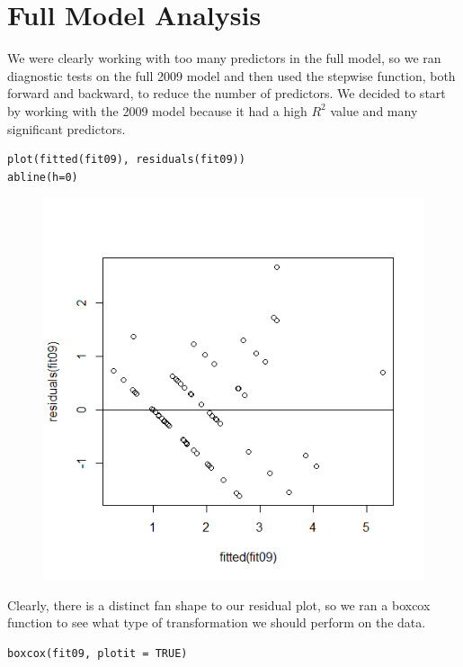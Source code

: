 \documentclass[]{scrartcl}
\begin{document}
\section*{Full Model Analysis}
We were clearly working with too many predictors in the full model, so we ran diagnostic tests on the full 2009 model and then used the stepwise function, both forward and backward, to reduce the number of predictors. We decided to start by working with the 2009 model because it had a high $R^{2}$ value and many significant predictors.
\footnotesize
\begin{verbatim}
plot(fitted(fit09), residuals(fit09))
abline(h=0)
\end{verbatim}
\normalsize
\begin{figure}[H]
	\centering
	\includegraphics[scale=.6]{2009resid.png}
\end{figure}
Clearly, there is a distinct fan shape to our residual plot, so we ran a boxcox function to see what type of transformation we should perform on the data.
\footnotesize
\begin{verbatim}
boxcox(fit09, plotit = TRUE)
\end{verbatim}
\normalsize
\end{document}
